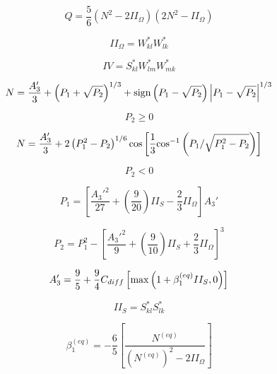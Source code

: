 \begin{equation}
Q = \frac{5}{6} \left( N^2 - 2 II_{\Omega} \right) \left( 2 N^2 - II_{\Omega} \right)
\end{equation}

\begin{equation}
II_{\Omega} = W_{kl}^*W_{lk}^*
\end{equation}

\begin{equation}
IV = S_{kl}^*W_{lm}^*W_{mk}^*
\end{equation}

\begin{equation}
N = \frac{A_3'}{3} + \left( P_1 + \sqrt{P_2} \right)^{1/3} + {\rm sign}
   \left( P_1 - \sqrt{P_2} \right) \left| P_1 - \sqrt{P_2} \right|^{1/3}
\end{equation}

\begin{equation}
P_2 \geq 0
\end{equation}

\begin{equation}
N = \frac{A_3'}{3} + 2\left( P_1^2 - P_2 \right)^{1/6}
   {\rm cos} \left[ \frac{1}{3} {\rm cos}^{-1} \left( P_1 / \sqrt{ P_1^2 - P_2} \right) \right]
\end{equation}

\begin{equation}
P_2 < 0
\end{equation}

\begin{equation}
P_1 = \left[ \frac{A_3'^2}{27} + \left( \frac{9}{20} \right) II_{S} - \frac{2}{3} II_{\Omega} \right] A_3'
\end{equation}

\begin{equation}
P_2 = P_1^2 - \left[ \frac{A_3'^2}{9} + \left( \frac{9}{10} \right) II_{S} + \frac{2}{3} II_{\Omega} \right]^3
\end{equation}

\begin{equation}
A_3' = \frac{9}{5} + \frac{9}{4} C_{diff} \left[ {\rm max} \left( 1 + \beta_1^{(eq)} II_S, 0 \right) \right]
\end{equation}

\begin{equation}
II_{S} = S_{kl}^*S_{lk}^*
\end{equation}

\begin{equation}
\beta_1^{(eq)} = - \frac{6}{5} \left[ \frac{N^{(eq)}}{\left(N^{(eq)}\right)^2 - 2 II_{\Omega}} \right]
\end{equation}

